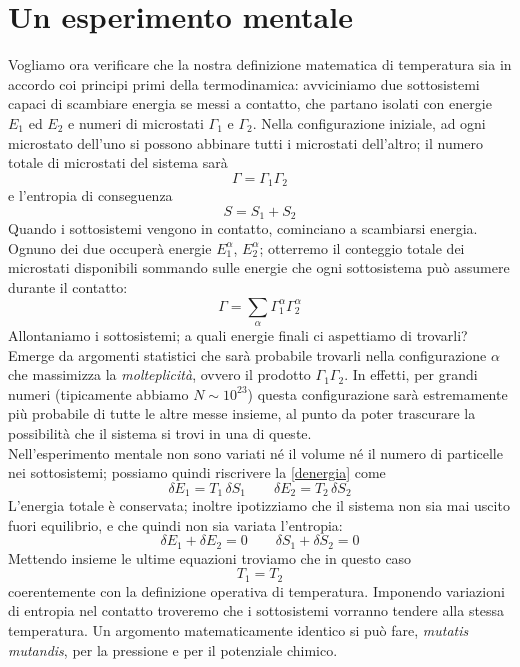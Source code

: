 \documentclass[a4paper]{report}
\begin{document}
\section{Un esperimento mentale}
Vogliamo ora verificare che la nostra definizione matematica di temperatura sia in accordo coi principi primi della termodinamica: avviciniamo due sottosistemi capaci di scambiare energia se messi a contatto, che partano isolati con energie $E_1$ ed $E_2$ e numeri di microstati $\Gamma_1$ e $\Gamma_2$. Nella configurazione iniziale, ad ogni microstato dell'uno si possono abbinare tutti i microstati dell'altro; il numero totale di microstati del sistema sarà
\begin{equation}
    \Gamma = \Gamma_1 \Gamma_2
\end{equation}
e l'entropia di conseguenza 
\begin{equation}
    S = S_1 + S_2
\end{equation}
Quando i sottosistemi vengono in contatto, cominciano a scambiarsi energia. Ognuno dei due occuperà energie $E_{1}^{\alpha}$, $E_{2}^{\alpha}$; otterremo il conteggio totale dei microstati disponibili sommando sulle energie che ogni sottosistema può assumere durante il contatto:
\begin{equation}
    \Gamma = \sum_{\alpha}\Gamma_{1}^{\alpha}\Gamma_{2}^{\alpha}
\end{equation}
Allontaniamo i sottosistemi; a quali energie finali ci aspettiamo di trovarli? Emerge da argomenti statistici che sarà probabile trovarli nella configurazione $\alpha$ che massimizza la \textit{molteplicità}, ovvero il prodotto $\Gamma_1\Gamma_2$. In effetti, per grandi numeri (tipicamente abbiamo $N \sim 10^{23}$) questa configurazione sarà estremamente più probabile di tutte le altre messe insieme, al punto da poter trascurare la possibilità che il sistema si trovi in una di queste. \\
Nell'esperimento mentale non sono variati né il volume né il numero di particelle nei sottosistemi; possiamo quindi riscrivere la \eqref{denergia} come
\begin{equation}
    \delta E_1 = T_1 \,\delta S_1 \qquad \delta E_2 = T_2\, \delta S_2
\end{equation}
L'energia totale è conservata; inoltre ipotizziamo che il sistema non sia mai uscito fuori equilibrio, e che quindi non sia variata l'entropia:
\begin{equation}
    \delta E_1 + \delta E_2 = 0 \qquad \delta S_1 + \delta S_2 = 0
\end{equation}
Mettendo insieme le ultime equazioni troviamo che in questo caso 
\begin{equation}
    T_1 = T_2
\end{equation}
coerentemente con la definizione operativa di temperatura. Imponendo variazioni di entropia nel contatto troveremo che i sottosistemi vorranno tendere alla stessa temperatura. Un argomento matematicamente identico si può fare, \textit{mutatis mutandis}, per la pressione e per il potenziale chimico. \\
\end{document}

